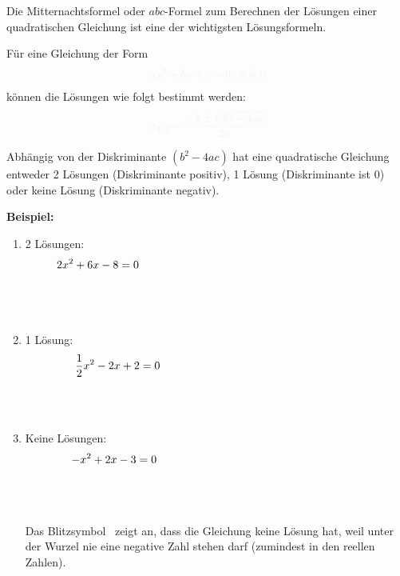 Die Mitternachtsformel oder \(abc\)-Formel zum Berechnen der Lösungen einer quadratischen Gleichung ist eine der wichtigsten Lösungsformeln.
\begin{tcolorbox}
	Für eine Gleichung der Form
	\begin{align*}
		\textcolor{loestc}{ax^2+bx+c=0,\ a\neq 0}
	\end{align*}
	können die Lösungen wie folgt bestimmt werden:
	\begin{align*}
		\textcolor{loestc}{x_{1/2}=\frac{-b\pm \sqrt{b^2-4ac}}{2a}}
	\end{align*}
\end{tcolorbox}
Abhängig von der Diskriminante \(\left( b^2-4ac\right) \) hat eine quadratische Gleichung entweder 2 Lösungen (Diskriminante positiv), 1 Lösung (Diskriminante ist 0) oder keine Lösung (Diskriminante negativ).

\textbf{Beispiel:}
\begin{enumerate}[label=\arabic*)]
	\item 2 Lösungen:
	\begin{align*}
		2x^2+6x-8&=0\\
		\textcolor{loes}{x_{1/2}}&\textcolor{loes}{\;=\frac{-6\pm \sqrt{6^2-4\cdot2\cdot(-8)}}{2\cdot2}=\frac{-6\pm \sqrt{100}}{4}=\frac{-6\pm 10}{4}}\\
		\textcolor{loes}{\Rightarrow x_1}&\textcolor{loes}{\;=1 \text{ und } x_2=-4}
	\end{align*}

    \bigskip

	\item 1 Lösung:
	\begin{align*}
		\frac{1}{2}x^2-2x+2&=0\\
		\textcolor{loes}{x_{1/2}}&\textcolor{loes}{\;=\frac{-(-2)\pm \sqrt{(-2)^2-4\cdot\frac{1}{2}\cdot2}}{2\cdot\frac{1}{2}}=2\pm\sqrt{0}=2}
	\end{align*}

    \bigskip

	\item Keine Lösungen:
	\begin{align*}
		-x^2+2x-3&=0\\
	\textcolor{loes}{x_{1/2}}&\textcolor{loes}{\;=\frac{-2\pm \sqrt{2^2-4\cdot(-1)\cdot(-3)}}{2\cdot(-1)}=\frac{-2\pm\sqrt{-8}}{-2}\Lightning}
	\end{align*}\\
	\textcolor{loes}{Das Blitzsymbol {\Lightning}\ zeigt an, dass die Gleichung keine Lösung hat, weil unter der Wurzel nie eine negative Zahl stehen darf (zumindest in den reellen Zahlen).}
\end{enumerate}

